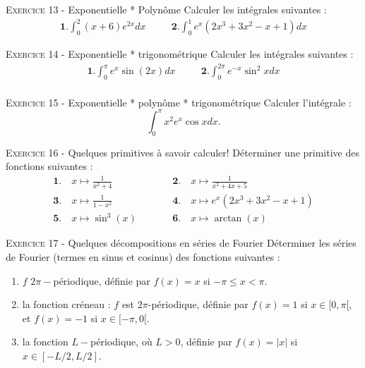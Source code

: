 

\vskip0.3cm\noindent\textsc{Exercice 13} - Exponentielle * Polynôme
\vskip0.2cm
Calculer les intégrales suivantes  :
$$\begin{array}{lcl}
\displaystyle \mathbf{1.}\int_{0}^2 (x+6)e^{2x}dx &\quad&\displaystyle \mathbf{2.} \int_0^1 e^x(2x^3+3x^2-x+1)dx
\end{array}$$




\vskip0.3cm\noindent\textsc{Exercice 14} - Exponentielle * trigonométrique
\vskip0.2cm
Calculer les intégrales suivantes  :
$$\begin{array}{lcl}
\displaystyle \mathbf{1.} \int_0^\pi e^x\sin(2x)dx&\quad&\displaystyle \mathbf{2.} \int_0^{2\pi}e^{-x}\sin^2 xdx\\
\end{array}$$




\vskip0.3cm\noindent\textsc{Exercice 15} - Exponentielle * polynôme * trigonométrique
\vskip0.2cm
Calculer l'intégrale :
$$\int_0^\pi x^2e^x \cos xdx.$$




\vskip0.3cm\noindent\textsc{Exercice 16} - Quelques primitives à savoir calculer!
\vskip0.2cm
Déterminer une primitive des fonctions suivantes :
$$
\begin{array}{lcl}
\displaystyle \mathbf{1.}\quad x\mapsto \frac{1}{x^2+4}&\quad\quad&\displaystyle \mathbf{2.}\quad x\mapsto\frac{1}{x^2+4x+5}\\
\displaystyle \mathbf{3.}\quad x\mapsto \frac{1}{1-x^2}&&\displaystyle \mathbf{4.}\quad x\mapsto e^x(2x^3+3x^2-x+1)\\
\displaystyle \mathbf{5.}\quad x\mapsto\sin^3(x)&&\displaystyle \mathbf{6.}\quad x\mapsto \arctan(x)
\end{array}$$





\vskip0.3cm\noindent\textsc{Exercice 17} - Quelques décompositions en séries de Fourier
\vskip0.2cm
Déterminer les séries de Fourier (termes en sinus et cosinus) des fonctions suivantes :
\begin{enumerate}
\item $f$ $2\pi-$périodique, définie par $f(x)=x$ si $-\pi\leq x<\pi$.
\item la fonction créneau : $f$ est $2\pi$-périodique, définie par $f(x)=1$ si $x\in[0,\pi[$, et $f(x)=-1$ si $x\in[-\pi,0[$.
\item la fonction $L-$périodique, où $L>0$, définie par $f(x)=|x|$ si $x\in[-L/2,L/2]$.
\end{enumerate}




\vskip0.5cm

